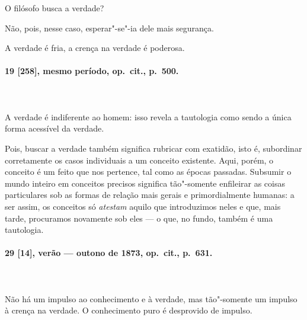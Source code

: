 O filósofo busca a verdade?

Não, pois, nesse caso, esperar"-se"-ia dele mais segurança.

A verdade é fria, a crença na verdade é poderosa.

\pagebreak
\paragraph*{19 [258], mesmo período, op.~cit., p.~500.}
\ \\
\ \\

A verdade é indiferente ao homem: isso revela a tautologia como sendo a
única forma acessível da verdade.

Pois, buscar a verdade também significa rubricar com exatidão, isto é,
subordinar corretamente os casos individuais a um conceito existente.
Aqui, porém, o conceito é um feito que nos pertence, tal como as épocas
passadas. Subsumir o mundo inteiro em conceitos precisos significa
tão"-somente enfileirar as coisas particulares sob as formas de relação
mais gerais e primordialmente humanas: a ser assim, os conceitos só
\textit{atestam} aquilo que introduzimos neles e que, mais tarde,
procuramos novamente sob eles --- o que, no fundo, também é uma
tautologia.

\pagebreak
\paragraph*{29 [14], verão --- outono de 1873, op.~cit., p.~631.}
\ \\
\ \\

Não há um impulso ao conhecimento e à verdade, mas tão"-somente um
impulso à crença na verdade. O conhecimento puro é desprovido de
impulso.
